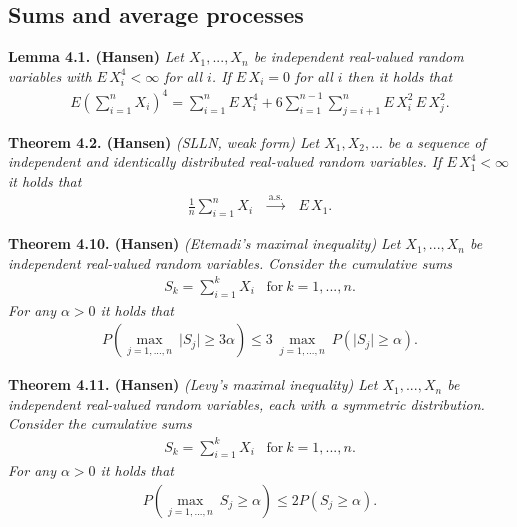 \documentclass[
]{book}
\begin{document}
\pagebreak

\hypertarget{sums-and-average-processes}{%
\subsection{Sums and average processes}\label{sums-and-average-processes}}

\textbf{Lemma 4.1. (Hansen)} \emph{Let \(X_1,...,X_n\) be independent real-valued random variables with \(E\, X_i^4<\infty\) for all \(i\). If \(E\, X_i=0\) for all \(i\) then it holds that}
\begin{align*}
    E\left(\sum_{i=1}^n X_i\right)^4=\sum_{i=1}^n E\, X_i^4+6\sum_{i=1}^{n-1}\sum_{j=i+1}^n E\, X_i^2\,E\,X_j^2.
\end{align*}

\textbf{Theorem 4.2. (Hansen)} \emph{(SLLN, weak form) Let \(X_1,X_2,...\) be a sequence of independent and identically distributed real-valued random variables. If \(E\, X_1^4<\infty\) it holds that}
\begin{align*}
    \frac{1}{n}\sum_{i=1}^n X_i \hspace{10pt}\stackrel{\text{a.s.}}{\to} \hspace{10pt}E\, X_1.\tag{4.3}
\end{align*}

\textbf{Theorem 4.10. (Hansen)} \emph{(Etemadi's maximal inequality) Let \(X_1,...,X_n\) be independent real-valued random variables. Consider the cumulative sums}
\begin{align*}
    S_k=\sum_{i=1}^kX_i\hspace{10pt}\text{for}\ k=1,..., n.
\end{align*}
\emph{For any \(\alpha >0\) it holds that}
\begin{align*}
    P\left(\max_{j=1,...,n}\ \vert S_j\vert\ge 3\alpha\right)\le 3\ \max_{j=1,...,n}\ P(\vert S_j\vert \ge \alpha).\tag{4.11}
\end{align*}

\textbf{Theorem 4.11. (Hansen)} \emph{(Levy's maximal inequality) Let \(X_1,...,X_n\) be independent real-valued random variables, each with a symmetric distribution. Consider the cumulative sums}
\begin{align*}
    S_k=\sum_{i=1}^kX_i\hspace{10pt}\text{for}\ k=1,..., n.
\end{align*}
\emph{For any \(\alpha>0\) it holds that}
\begin{align*}
    P\left(\max_{j=1,...,n}\ S_j\ge \alpha\right)\le 2 P(S_j\ge \alpha).\tag{4.13}
\end{align*}
\end{document}
